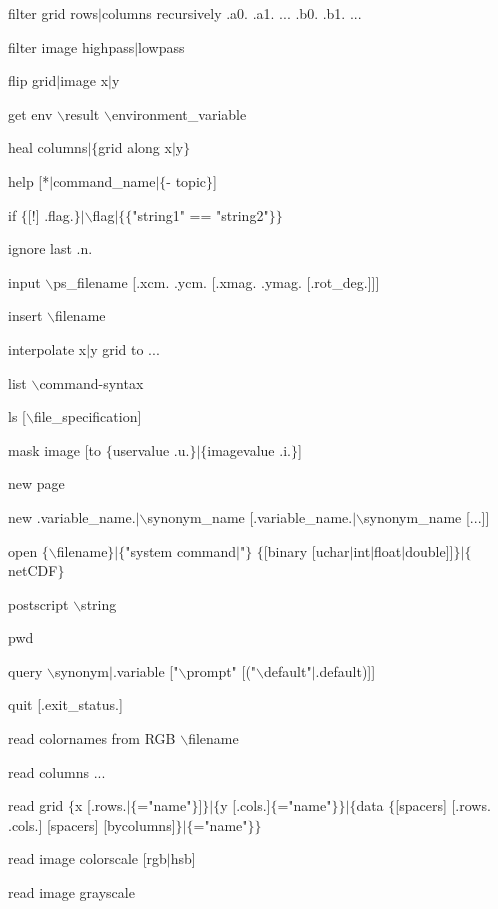 filter grid rows$\mid$columns recursively .a0. .a1. ... .b0. .b1. ...

filter image highpass$\mid$lowpass

flip grid$\mid$image x$\mid$y

get env $\backslash$result $\backslash$environment\_variable

heal columns$\mid$$\lbrace$grid along x$\mid$y$\rbrace$

help [*$\mid$command\_name$\mid$$\lbrace$- topic$\rbrace$]

if $\lbrace$[!] .flag.$\rbrace$$\mid$$\backslash$flag$\mid$$\lbrace$$\lbrace$"string1" == "string2"$\rbrace$$\rbrace$

ignore last .n.

input $\backslash$ps\_filename [.xcm. .ycm. [.xmag. .ymag. [.rot\_deg.]]]

insert $\backslash$filename

interpolate x$\mid$y grid to ...

list $\backslash$command-syntax

ls [$\backslash$file\_specification]

mask image [to $\lbrace$uservalue .u.$\rbrace$$\mid$$\lbrace$imagevalue .i.$\rbrace$]

new page

new .variable\_name.$\mid$$\backslash$synonym\_name [.variable\_name.$\mid$$\backslash$synonym\_name [...]]

open $\lbrace$$\backslash$filename$\rbrace$$\mid$$\lbrace$"system command$\mid$"$\rbrace$ $\lbrace$[binary [uchar$\mid$int$\mid$float$\mid$double]]$\rbrace$$\mid$$\lbrace$netCDF$\rbrace$

postscript $\backslash$string

pwd

query $\backslash$synonym$\mid$.variable ["$\backslash$prompt" [("$\backslash$default"$\mid$.default)]]

quit [.exit\_status.]

read colornames from RGB $\backslash$filename

read columns ...

read grid $\lbrace$x [.rows.$\mid$$\lbrace$="name"$\rbrace$]$\rbrace$$\mid$$\lbrace$y [.cols.]$\lbrace$="name"$\rbrace$$\rbrace$$\mid$$\lbrace$data $\lbrace$[spacers] [.rows. .cols.] [spacers] [bycolumns]$\rbrace$$\mid$$\lbrace$="name"$\rbrace$$\rbrace$

read image colorscale [rgb$\mid$hsb]

read image grayscale

